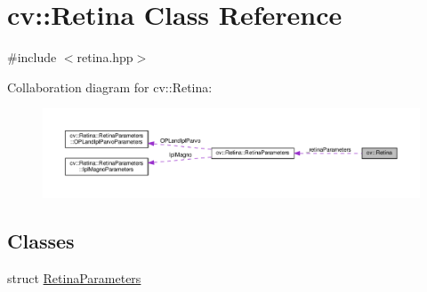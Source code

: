 \hypertarget{classcv_1_1Retina}{\section{cv\-:\-:Retina Class Reference}
\label{classcv_1_1Retina}
}


{\ttfamily \#include $<$retina.\-hpp$>$}



Collaboration diagram for cv\-:\-:Retina\-:\nopagebreak
\begin{figure}[H]
\begin{center}
\leavevmode
\includegraphics[width=350pt]{classcv_1_1Retina__coll__graph}
\end{center}
\end{figure}
\subsection*{Classes}
\begin{DoxyCompactItemize}
\item 
struct \hyperlink{structcv_1_1Retina_1_1RetinaParameters}{Retina\-Parameters}
\end{DoxyCompactItemize}
